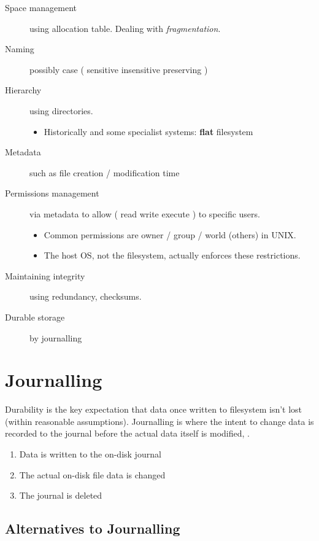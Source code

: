 \begin{description}
\item[Space management]
using allocation table. Dealing with \emph{fragmentation}.
\item[Naming]
possibly case ( sensitive \textbar{} insensitive \textbar{} preserving )
\item[Hierarchy]
using directories.

\begin{itemize}

\item
  Historically and some specialist systems: \textbf{flat} filesystem
\end{itemize}
\item[Metadata]
such as file creation / modification time
\item[Permissions management]
via metadata to allow ( read \textbar{} write \textbar{} execute ) to
specific users.

\begin{itemize}
\item
  Common permissions are owner / group / world (others) in UNIX.
\item
  The host OS, not the filesystem, actually enforces these restrictions.
\end{itemize}
\item[Maintaining integrity]
using redundancy, checksums.
\item[Durable storage]
by journalling
\end{description}

\section{Journalling}\label{journalling}

Durability is the key expectation that data once written to filesystem
isn't lost (within reasonable assumptions). Journalling is where the
intent to change data is recorded to the journal before the actual data
itself is modified, .

\begin{enumerate}
\def\labelenumi{\arabic{enumi}.}
\item
  Data is written to the on-disk journal
\item
  The actual on-disk file data is changed
\item
  The journal is deleted
\end{enumerate}

\subsection{Alternatives to
Journalling}\label{alternatives-to-journalling}

